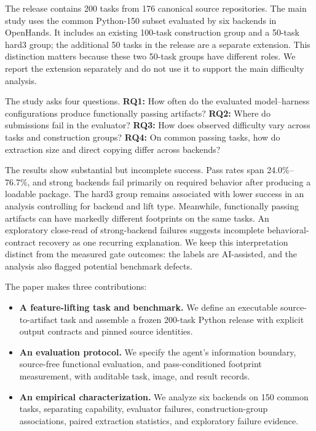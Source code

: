 \documentclass[acmsmall,screen,review,anonymous]{acmart}
\begin{document}
The release contains 200 tasks from 176 canonical source repositories. The main
study uses the common Python-150 subset evaluated by six backends in OpenHands.
It includes an existing 100-task construction group and a 50-task hard3 group;
the additional 50 tasks in the release are a separate extension. This distinction
matters because these two 50-task groups have different roles. We report the
extension separately and do not use it to support the main difficulty analysis.

The study asks four questions. \textbf{RQ1:} How often do the evaluated
model--harness configurations produce functionally passing artifacts?
\textbf{RQ2:} Where do submissions fail in the evaluator?
\textbf{RQ3:} How does observed difficulty vary across tasks and construction
groups? \textbf{RQ4:} On common passing tasks, how do extraction size and direct
copying differ across backends?

The results show substantial but incomplete success. Pass rates span
24.0\%--76.7\%, and strong backends fail primarily on required behavior after
producing a loadable package. The hard3 group remains associated with lower
success in an analysis controlling for backend and lift type. Meanwhile,
functionally passing artifacts can have markedly different footprints on the
same tasks. An exploratory close-read of strong-backend failures suggests
incomplete behavioral-contract recovery as one recurring explanation. We keep
this interpretation distinct from the measured gate outcomes: the labels are
AI-assisted, and the analysis also flagged potential benchmark defects.

The paper makes three contributions:
\begin{itemize}
 \item \textbf{A feature-lifting task and benchmark.} We define an executable
 source-to-artifact task and assemble a frozen 200-task Python release with
 explicit output contracts and pinned source identities.
 \item \textbf{An evaluation protocol.} We specify the agent's information
 boundary, source-free functional evaluation, and pass-conditioned footprint
 measurement, with auditable task, image, and result records.
 \item \textbf{An empirical characterization.} We analyze six backends on
 150 common tasks, separating capability, evaluator failures, construction-group
 associations, paired extraction statistics, and exploratory failure evidence.
\end{itemize}
\end{document}
